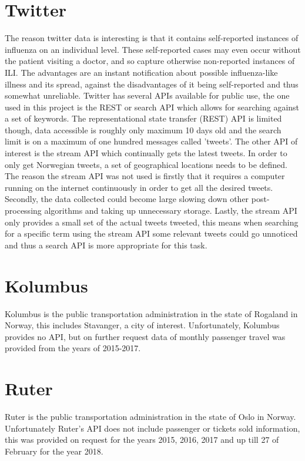 \section{Twitter}
The reason twitter data is interesting is that it contains self-reported instances of influenza on an individual level. These self-reported cases may even occur without the patient visiting a doctor, and so capture otherwise non-reported instances of ILI. The advantages are an instant notification about possible influenza-like illness and its spread, against the disadvantages of it being self-reported and thus somewhat unreliable. Twitter has several APIs available for public use, the one used in this project is the REST or search API which allows for searching against a set of keywords. The representational state transfer (REST) API is limited though, data accessible is roughly only maximum 10 days old and the search limit is on a maximum of one hundred messages called 'tweets'. The other API of interest is the stream API which continually gets the latest tweets. In order to only get Norwegian tweets, a set of geographical locations needs to be defined. The reason the stream API was not used is firstly that it requires a computer running on the internet continuously in order to get all the desired tweets. Secondly, the data collected could become large slowing down other post-processing algorithms and taking up unnecessary storage. Lastly, the stream API only provides a small set of the actual tweets tweeted, this means when searching for a specific term using the stream API some relevant tweets could go unnoticed and thus a search API is more appropriate for this task.

\section{Kolumbus}
Kolumbus is the public transportation administration in the state of Rogaland in Norway, this includes Stavanger, a city of interest. Unfortunately, Kolumbus provides no API, but on further request data of monthly passenger travel was provided from the years of 2015-2017.

\section{Ruter}
Ruter is the public transportation administration in the state of Oslo in Norway. Unfortunately Ruter's API does not include passenger or tickets sold information, this was provided on request for the years 2015, 2016, 2017 and up till 27 of February for the year 2018.